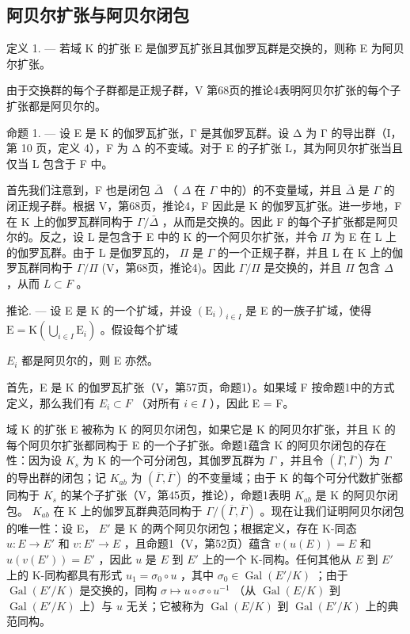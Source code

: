 \subsection{阿贝尔扩张与阿贝尔闭包}

定义 1. --- 若域 K 的扩张 E 是伽罗瓦扩张且其伽罗瓦群是交换的，则称 E 为阿贝尔扩张。

由于交换群的每个子群都是正规子群，V 第68页的推论4表明阿贝尔扩张的每个子扩张都是阿贝尔的。

命题 1. --- 设 E 是 K 的伽罗瓦扩张，Γ 是其伽罗瓦群。设 Δ 为 Γ 的导出群（I，第 10 页，定义 4），F 为 Δ 的不变域。对于 E 的子扩张 L，其为阿贝尔扩张当且仅当 L 包含于 F 中。

首先我们注意到，F 也是闭包 \(\bar{\Delta}\) （ \(\Delta\) 在 \(\Gamma\) 中的）的不变量域，并且 \(\bar{\Delta}\) 是 \(\Gamma\) 的闭正规子群。根据 V，第68页，推论4，F 因此是 K 的伽罗瓦扩张。进一步地，F 在 K 上的伽罗瓦群同构于 \(\Gamma/\bar{\Delta}\) ，从而是交换的。因此 F 的每个子扩张都是阿贝尔的。反之，设 L 是包含于 E 中的 K 的一个阿贝尔扩张，并令 \(\Pi\) 为 E 在 L 上的伽罗瓦群。由于 L 是伽罗瓦的， \(\Pi\) 是 \(\Gamma\) 的一个正规子群，并且 L 在 K 上的伽罗瓦群同构于 \(\Gamma/\Pi\) (V，第68页，推论4)。因此 \(\Gamma/\Pi\) 是交换的，并且 \(\Pi\) 包含 \(\Delta\) ，从而 \(L \subset F\) 。

推论. --- 设 E 是 K 的一个扩域，并设 \((\mathrm{E}_{i})_{i\in I}\) 是 E 的一族子扩域，使得 \(\mathrm{E}=\mathrm{K}\left(\bigcup_{i\in I}\mathrm{E}_{i}\right)\) 。假设每个扩域

\(E_{i}\) 都是阿贝尔的，则 E 亦然。

首先，E 是 K 的伽罗瓦扩张（V，第57页，命题1）。如果域 F 按命题1中的方式定义，那么我们有 \(E_{i} \subset F\) （对所有 \(i \in I\) ），因此 E = F。

域 K 的扩张 E 被称为 K 的阿贝尔闭包，如果它是 K 的阿贝尔扩张，并且 K 的每个阿贝尔扩张都同构于 E 的一个子扩张。命题1蕴含 K 的阿贝尔闭包的存在性：因为设 \(K_{s}\) 为 K 的一个可分闭包，其伽罗瓦群为 \(\Gamma\) ，并且令 \((\overline{\Gamma},\overline{\Gamma})\) 为 \(\Gamma\) 的导出群的闭包；记 \(K_{ab}\) 为 \((\overline{\Gamma},\overline{\Gamma})\) 的不变量域；由于 K 的每个可分代数扩张都同构于 \(K_{s}\) 的某个子扩张（V，第45页，推论），命题1表明 \(K_{ab}\) 是 K 的阿贝尔闭包。 \(K_{ab}\) 在 K 上的伽罗瓦群典范同构于 \(\Gamma/(\overline{\Gamma},\overline{\Gamma})\) 。现在让我们证明阿贝尔闭包的唯一性：设 E， \(E'\) 是 K 的两个阿贝尔闭包；根据定义，存在 K-同态 \(u:E\to E'\) 和 \(v:E'\to E\) ，且命题1（V，第52页）蕴含 \(v(u(E)) = E\) 和 \(u(v(E')) = E'\) ，因此 \(u\) 是 \(E\) 到 \(E'\) 上的一个 K-同构。任何其他从 \(E\) 到 \(E'\) 上的 K-同构都具有形式 \(u_1 = \sigma_0 \circ u\) ，其中 \(\sigma_0 \in \operatorname{Gal}(E'/K)\) ；由于 \(\operatorname{Gal}(E'/K)\) 是交换的，同构 \(\sigma \mapsto u \circ \sigma \circ u^{-1}\) （从 \(\operatorname{Gal}(E/K)\) 到 \(\operatorname{Gal}(E'/K)\) 上）与 \(u\) 无关；它被称为 \(\operatorname{Gal}(E/K)\) 到 \(\operatorname{Gal}(E'/K)\) 上的典范同构。

